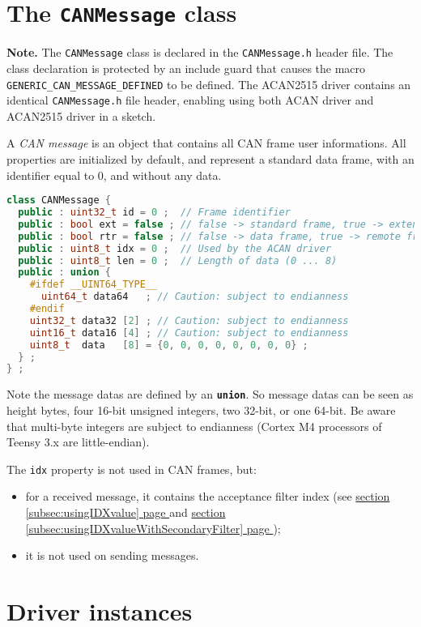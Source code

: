\documentclass[10pt, a4paper, obeyspaces, openany]{extarticle}
\newcommand \sectionLabel[2]{\section{#1}\label{sec:#2}}
\newcommand\refSubsectionPage[1]{\hyperref[subsec:#1]{section \ref*{subsec:#1} page \pageref{subsec:#1}}}
\begin{document}
\sectionLabel{The \texttt{CANMessage} class}{CANMessageClass}

{\bf Note. } The \texttt{CANMessage} class is declared in the \texttt{CANMessage.h} header file. The class declaration is protected by an include guard that causes the macro \texttt{GENERIC\_CAN\_MESSAGE\_DEFINED} to be defined. The ACAN2515 driver contains an identical \texttt{CANMessage.h} file header, enabling using both ACAN driver and ACAN2515 driver in a sketch.

A \emph{CAN message} is an object that contains all CAN frame user informations. All properties are initialized by default, and represent a standard data frame, with an identifier equal to $0$, and without any data.

{ \small\begin{lstlisting}[language=c++]
class CANMessage {
  public : uint32_t id = 0 ;  // Frame identifier
  public : bool ext = false ; // false -> standard frame, true -> extended frame
  public : bool rtr = false ; // false -> data frame, true -> remote frame
  public : uint8_t idx = 0 ;  // Used by the ACAN driver
  public : uint8_t len = 0 ;  // Length of data (0 ... 8)
  public : union {
    #ifdef __UINT64_TYPE__
      uint64_t data64   ; // Caution: subject to endianness
    #endif
    uint32_t data32 [2] ; // Caution: subject to endianness
    uint16_t data16 [4] ; // Caution: subject to endianness
    uint8_t  data   [8] = {0, 0, 0, 0, 0, 0, 0, 0} ;
  } ;
} ;
\end{lstlisting}}

Note the message datas are defined by an {\bf\texttt{union}}. So message datas can be seen as height bytes, four 16-bit unsigned integers, two 32-bit, or one 64-bit. Be aware that multi-byte integers are subject to endianness (Cortex M4 processors of Teensy 3.x are little-endian).

The \texttt{idx} property is not used in CAN frames, but:
\begin{itemize}
  \item for a received message, it contains the acceptance filter index (see \refSubsectionPage{usingIDXvalue} and \refSubsectionPage{usingIDXvalueWithSecondaryFilter});
  \item it is not used on sending messages.
\end{itemize}









\sectionLabel{Driver instances}{driverInstances}
\end{document}
